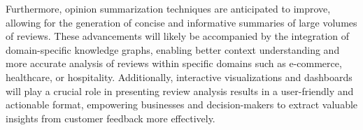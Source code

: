 Furthermore, opinion summarization techniques are anticipated to improve, allowing for the generation of concise and informative summaries of large volumes of reviews. These advancements will likely be accompanied by the integration of domain-specific knowledge graphs, enabling better context understanding and more accurate analysis of reviews within specific domains such as e-commerce, healthcare, or hospitality. Additionally, interactive visualizations and dashboards will play a crucial role in presenting review analysis results in a user-friendly and actionable format, empowering businesses and decision-makers to extract valuable insights from customer feedback more effectively.
